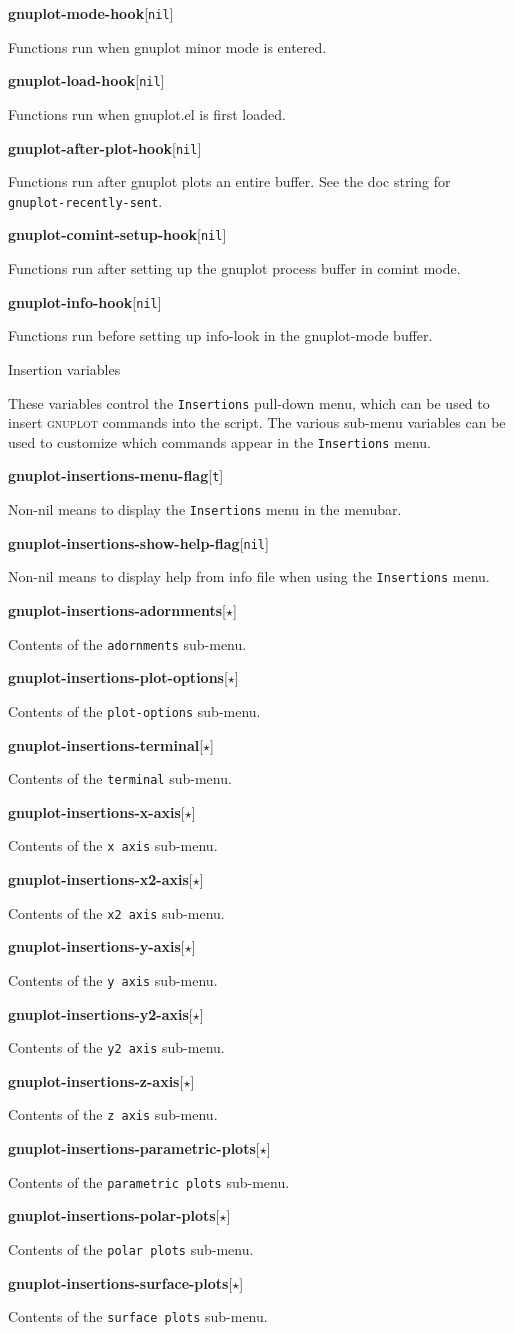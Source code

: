 \documentclass[twocolumn]{article}
\newenvironment{Boxedminipage}%
{\begin{Sbox}\begin{minipage}}%
  {\end{minipage}\end{Sbox}\Ovalbox{\TheSbox}}
\def\variable#1#2#3{{
    \vspace{-0.2truecm}
    \begin{flushright}
      \begin{minipage}[h]{0.97\linewidth}
        \vspace{-0.2truecm}
        \textbf{#1}\hfill[\texttt{#2}]
        \begin{flushright}
          \begin{minipage}[h]{0.93\linewidth}
            \vspace{-0.2truecm}
            #3
          \end{minipage}
        \end{flushright}
      \end{minipage}
    \end{flushright}
    }}
\def\Star{{$\star$}}
\begin{document}
\variable{gnuplot-mode-hook}{nil}{Functions run when gnuplot minor
  mode is entered.}
%
\variable{gnuplot-load-hook}{nil}{Functions run when gnuplot.el is
  first loaded.}
%
\variable{gnuplot-after-plot-hook}{nil}{Functions run after gnuplot
  plots an entire buffer.  See the doc string for
  \texttt{gnuplot-recently-sent}.}
%
\variable{gnuplot-comint-setup-hook}{nil}{Functions run after setting
  up the gnuplot process buffer in comint mode.}
%
\variable{gnuplot-info-hook}{nil}{Functions run before setting up
  info-look in the gnuplot-mode buffer.}



\begin{center}
  \begin{Boxedminipage}{0.75\linewidth}
    \begin{center}
      {\large Insertion variables}
    \end{center}
  \end{Boxedminipage}
\end{center}

\noindent These variables control the \texttt{Insertions} pull-down
menu, which can be used to insert \textsc{gnuplot} commands into the
script.  The various sub-menu variables can be used to customize which
commands appear in the \texttt{Insertions} menu.

\vspace{2ex}
%
\variable{gnuplot-insertions-menu-flag}{t}{Non-nil means to display
  the \texttt{Insertions} menu in the menubar.}
%
\variable{gnuplot-insertions-show-help-flag}{nil}{Non-nil means to
  display help from info file when using the \texttt{Insertions}
  menu.}
%
\variable{gnuplot-insertions-adornments}{\Star}{Contents of the
  \texttt{adornments} sub-menu.}
%
\variable{gnuplot-insertions-plot-options}{\Star}{Contents of the
  \texttt{plot-options} sub-menu.}
%
\variable{gnuplot-insertions-terminal}{\Star}{Contents of the
  \texttt{terminal} sub-menu.}
%
\variable{gnuplot-insertions-x-axis}{\Star}{Contents of the \texttt{x
    axis} sub-menu.}
%
\variable{gnuplot-insertions-x2-axis}{\Star}{Contents of the \texttt{x2
    axis} sub-menu.}
%
\variable{gnuplot-insertions-y-axis}{\Star}{Contents of the \texttt{y
    axis} sub-menu.}
%
\variable{gnuplot-insertions-y2-axis}{\Star}{Contents of the \texttt{y2
    axis} sub-menu.}
%
\variable{gnuplot-insertions-z-axis}{\Star}{Contents of the \texttt{z
    axis} sub-menu.}
%
\variable{gnuplot-insertions-parametric-plots}{\Star}{Contents of the
  \texttt{parametric plots} sub-menu.}
%
\variable{gnuplot-insertions-polar-plots}{\Star}{Contents of the
  \texttt{polar plots} sub-menu.}
%
\variable{gnuplot-insertions-surface-plots}{\Star}{Contents of the
  \texttt{surface plots} sub-menu.}
\end{document}
